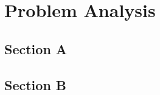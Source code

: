 \chapter{Problem Analysis}
\lipsum[4]
\section{Section A}
\lipsum[5-8]
\section{Section B}
\lipsum[9-12]\parencite{example_2020}